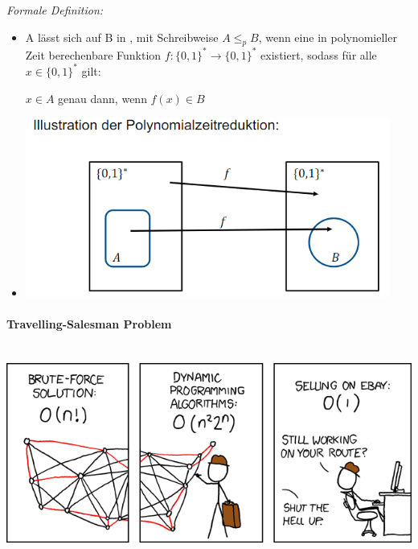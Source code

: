 \documentclass[
    ngerman,
    color=3b,
    dark_mode,
    load_common, %
    summary,
    boxarc,
]{tuda_summary}
\begin{document}
\textit{Formale Definition:}
\begin{itemize}
      \item[]
            A lässt sich auf B in , mit Schreibweise $A \leq_p B$, wenn eine
            in polynomieller Zeit berechenbare Funktion $f: \{0,1\}^* \rightarrow \{0,1\}^*$ existiert, sodass
            für alle $x \in \{0,1\}^*$ gilt: \\
            \centerline{$x \in A$ genau dann, wenn $f(x)\in B$}
      \item[] \includegraphics[width=12cm]{pictures/reduktion2.PNG}
\end{itemize}

\clearpage

\paragraph{Travelling-Salesman Problem}\mbox{}\\
\includegraphics[width=.5\textwidth]{pictures/traveling_salesman.png}
\end{document}
